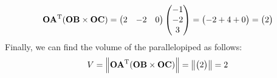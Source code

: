 \documentclass{beamer}
\begin{document}
\begin{frame}
    \begin{align}
        \mathbf{OA}^{\mathrm{T}}(\mathbf{OB} \times \mathbf{OC}) = \begin{pmatrix}2 & -2 & 0\end{pmatrix}\begin{pmatrix}-1 \\ -2 \\ 3\end{pmatrix} = \begin{pmatrix}-2 + 4 + 0\end{pmatrix} = \begin{pmatrix}2\end{pmatrix}
    \end{align}
    Finally, we can find the volume of the parallelopiped as follows:
    \begin{align}
        V = \left\lVert\mathbf{OA}^{\mathrm{T}}(\mathbf{OB} \times \mathbf{OC})\right\rVert = \left\lVert\begin{pmatrix}2\end{pmatrix}\right\rVert = 2
    \end{align}
\end{frame}
\end{document}
